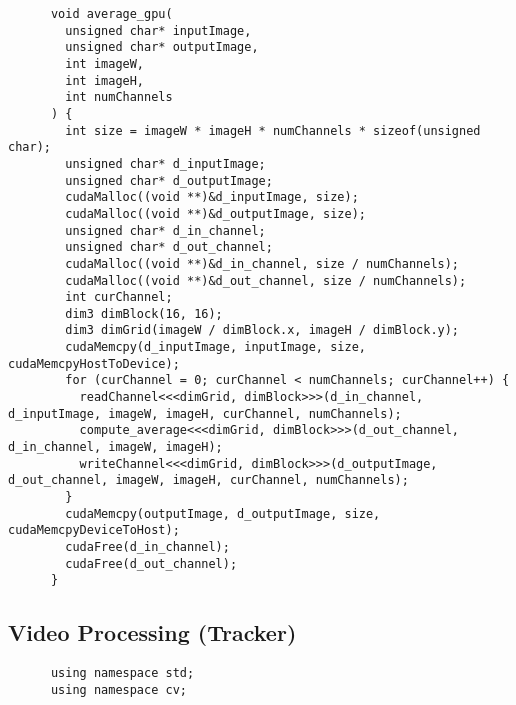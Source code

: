 \documentclass[8pt,a4paper]{article}
\begin{document}
\begin{multicols}{5}
\begin{verbatim}
      void average_gpu(
        unsigned char* inputImage,
        unsigned char* outputImage,
        int imageW,
        int imageH,
        int numChannels
      ) {
        int size = imageW * imageH * numChannels * sizeof(unsigned char);
        unsigned char* d_inputImage;
        unsigned char* d_outputImage;
        cudaMalloc((void **)&d_inputImage, size);
        cudaMalloc((void **)&d_outputImage, size);
        unsigned char* d_in_channel;
        unsigned char* d_out_channel;
        cudaMalloc((void **)&d_in_channel, size / numChannels);
        cudaMalloc((void **)&d_out_channel, size / numChannels);
        int curChannel;
        dim3 dimBlock(16, 16);
        dim3 dimGrid(imageW / dimBlock.x, imageH / dimBlock.y);
        cudaMemcpy(d_inputImage, inputImage, size, cudaMemcpyHostToDevice);
        for (curChannel = 0; curChannel < numChannels; curChannel++) {
          readChannel<<<dimGrid, dimBlock>>>(d_in_channel, d_inputImage, imageW, imageH, curChannel, numChannels);
          compute_average<<<dimGrid, dimBlock>>>(d_out_channel, d_in_channel, imageW, imageH);
          writeChannel<<<dimGrid, dimBlock>>>(d_outputImage, d_out_channel, imageW, imageH, curChannel, numChannels);
        }
        cudaMemcpy(outputImage, d_outputImage, size, cudaMemcpyDeviceToHost);
        cudaFree(d_in_channel);
        cudaFree(d_out_channel);
      }
    \end{verbatim}
    \subsection{Video Processing (Tracker)}
    \begin{verbatim}
      using namespace std;
      using namespace cv;


\end{verbatim}
\end{multicols}
\end{document}
